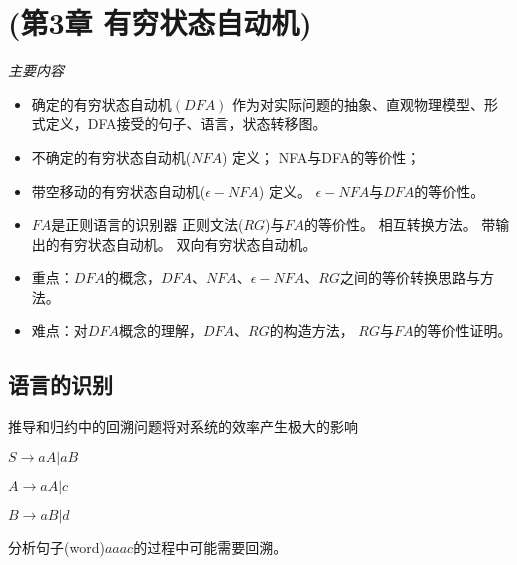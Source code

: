 \chapter{\cite{蒋宗礼2013}(第3章 有穷状态自动机)}

\emph{主要内容}
\begin{itemize} 
	\item 确定的有穷状态自动机$(DFA)$
		\subitem{-} 作为对实际问题的抽象、直观物理模型、形式定义，DFA接受的句子、语言，状态转移图。
	\item 不确定的有穷状态自动机($NFA$)
		\subitem{-} 定义；
		\subitem{-} NFA与DFA的等价性；
	\item 带空移动的有穷状态自动机($\epsilon-NFA$)
		\subitem{-} 定义。
		\subitem{-} $\epsilon-NFA$与$DFA$的等价性。
	\item $FA$是正则语言的识别器
		\subitem{-} 正则文法($RG$)与$FA$的等价性。
		\subitem{-} 相互转换方法。
		\subitem{-} 带输出的有穷状态自动机。
		\subitem{-} 双向有穷状态自动机。
	\item 重点：$DFA$的概念，$DFA$、$NFA$、$\epsilon-NFA$、$RG$之间的等价转换思路与方法。
	\item 难点：对$DFA$概念的理解，$DFA$、$RG$的构造方法， $RG$与$FA$的等价性证明。
\end{itemize}

\section{语言的识别}

\begin{svgraybox}
	推导和归约中的回溯问题将对系统的效率产生极大的影响 
	
	$S\to aA|aB$
	
	$A\to aA|c$
	
	$B\to aB|d$
	
	分析句子(word)$aaac$的过程中可能需要回溯。
\end{svgraybox}

